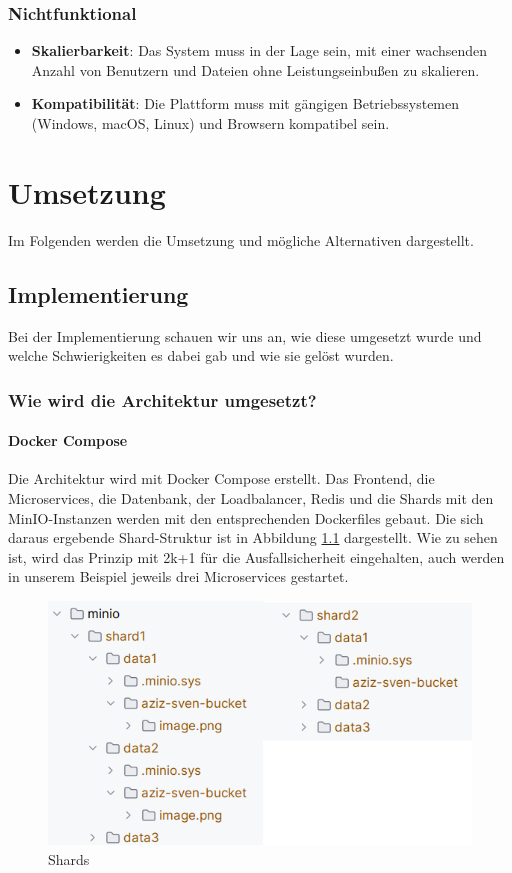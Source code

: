 \documentclass[12pt]{report}
\begin{document}
		\subsection{Nichtfunktional}
			\begin{itemize}
				\item \textbf{Skalierbarkeit}: Das System muss in der Lage sein, mit einer wachsenden Anzahl von Benutzern und Dateien ohne Leistungseinbußen zu skalieren.
				\item \textbf{Kompatibilität}: Die Plattform muss mit gängigen Betriebssystemen (Windows, macOS, Linux) und Browsern kompatibel sein.
			\end{itemize}

\chapter{Umsetzung}
	Im Folgenden werden die Umsetzung und mögliche Alternativen dargestellt.
	\section{Implementierung}
		Bei der Implementierung schauen wir uns an, wie diese umgesetzt wurde und welche Schwierigkeiten es dabei gab und wie sie gelöst wurden.
		\subsection{Wie wird die Architektur umgesetzt?}
			\subsubsection{Docker Compose}
				Die Architektur wird mit Docker Compose erstellt. Das Frontend, die Microservices, die Datenbank, der Loadbalancer, Redis und die Shards mit den MinIO-Instanzen werden mit den entsprechenden Dockerfiles gebaut. Die sich daraus ergebende Shard-Struktur ist in Abbildung \ref{fig:shards} dargestellt. Wie zu sehen ist, wird das Prinzip mit 2k+1 für die Ausfallsicherheit eingehalten, auch werden in unserem Beispiel jeweils drei Microservices gestartet.
		
				\begin{figure}[h]
					\centering
					\includegraphics[width=0.8\linewidth]{shards}
					\caption{Shards}
					\label{fig:shards}
				\end{figure}
			
\end{document}
